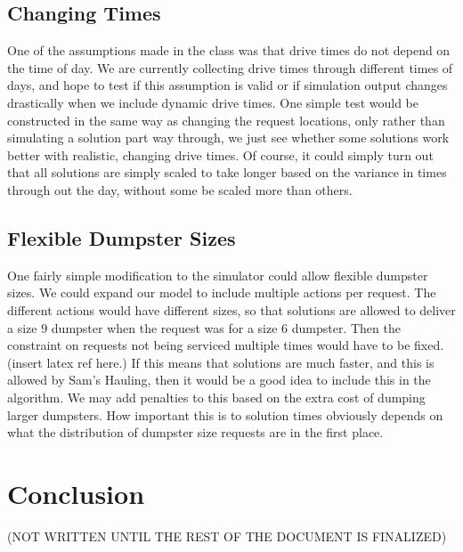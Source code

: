 \documentclass{article}
\begin{document}


\subsection{Changing Times}
One of the assumptions made in the class was that drive times do not depend on the time of day.
We are currently collecting drive times through different times of days, and hope to test if this assumption is valid or if simulation output changes drastically when we include dynamic drive times.
One simple test would be constructed in the same way as changing the request locations, only rather than simulating a solution part way through, we just see whether some solutions work better with realistic, changing drive times.
Of course, it could simply turn out that all solutions are simply scaled to take longer based on the variance in times through out the day, without some be scaled more than others.

\subsection{Flexible Dumpster Sizes}
One fairly simple modification to the simulator could allow flexible dumpster sizes.
We could expand our model to include multiple actions per request.
The different actions would have different sizes, so that solutions are allowed to deliver a size $9$ dumpster when the request was for a size $6$ dumpster.
Then the constraint on requests not being serviced multiple times would have to be fixed. (insert latex ref here.)
If this means that solutions are much faster, and this is allowed by Sam's Hauling, then it would be a good idea to include this in the algorithm.
We may add penalties to this based on the extra cost of dumping larger dumpsters.
How important this is to solution times obviously depends on what the distribution of dumpster size requests are in the first place.

\section{Conclusion}

(NOT WRITTEN UNTIL THE REST OF THE DOCUMENT IS FINALIZED)
\end{document}
